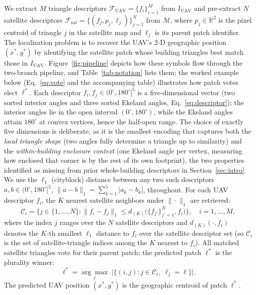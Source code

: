 \documentclass[10pt]{article}
\theoremstyle{plain}
\theoremstyle{definition}
\begin{document}
We extract $M$ triangle descriptors
$\mathcal{F}_{\mathrm{UAV}} = \{f_i\}_{i=1}^{M}$ from $I_{\mathrm{UAV}}$
and pre-extract $N$ satellite descriptors
$\mathcal{F}_{\mathrm{sat}} = \{(f_j, p_j, \ell_j)\}_{j=1}^{N}$ from
$\mathcal{M}$, where $p_j \in \mathbb{R}^2$ is the pixel centroid of triangle
$j$ in the satellite map and $\ell_j$ is its parent patch identifier.
The localization problem is to recover the UAV's 2-D geographic position
$(x^*, y^*)$ by identifying the satellite patch whose building triangles best
match those in $I_{\mathrm{UAV}}$.
Figure~\ref{fig:pipeline} depicts how these symbols flow through the two-branch
pipeline, and Table~\ref{tab:notation} lists them; the worked example below
(Eq.~\eqref{eq:vote} and the accompanying table) illustrates how patch votes
elect $\ell^*$.
Each descriptor $f_i,f_j\in(0^\circ,180^\circ]^5$ is a five-dimensional vector
(two sorted interior angles and three sorted Ekeland angles, Eq.~\eqref{eq:descriptor});
the interior angles lie in the open interval $(0^\circ,180^\circ)$, while the
Ekeland angles attain $180^\circ$ at convex vertices, hence the half-open range.
The choice of exactly five dimensions is deliberate, as it is the smallest
encoding that captures both the \emph{local triangle shape} (two angles fully
determine a triangle up to similarity) and the \emph{within-building enclosure
context} (one Ekeland angle per vertex, measuring how enclosed that corner is by
the rest of its own footprint), the two properties identified as missing from
prior whole-building descriptors in Section~\ref{sec:intro}.
We use the $\ell_1$ (cityblock) distance between any two such descriptors
$a,b\in(0^\circ,180^\circ]^5$,
$\|a - b\|_1 = \sum_{k=1}^{5}|a_k - b_k|$,
throughout. For each UAV descriptor $f_i$, the $K$ nearest satellite
neighbors under $\|\cdot\|_1$ are retrieved:
\begin{equation}
\mathcal{C}_i = \bigl\{j \in \{1,\dots,N\} :
  \|f_i - f_{j}\|_1 \le d_{(K)}\bigl(\{f_{j'}\}_{j'=1}^N, f_i\bigr)\bigr\},
\quad i = 1,\ldots,M,
\label{eq:retrieval}
\end{equation}
where the index $j$ ranges over the $N$ satellite descriptors and
$d_{(K)}(\cdot, f_i)$ denotes the $K$-th smallest $\ell_1$ distance
to $f_i$ over the satellite descriptor set (so $\mathcal{C}_i$ is the set of
satellite-triangle indices among the $K$ nearest to $f_i$).
All matched satellite triangles vote for their parent patch; the predicted
patch $\ell^*$ is the plurality winner:
\begin{equation}
\ell^* = \underset{\ell}{\arg\max}
\;\bigl|\{(i,j) : j \in \mathcal{C}_i,\;\ell_j = \ell\}\bigr|.
\label{eq:vote}
\end{equation}
The predicted UAV position $(x^*, y^*)$ is the geographic centroid of patch
$\ell^*$.
\end{document}
